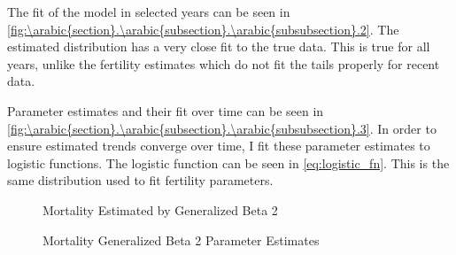 \documentclass[10pt]{article}
\renewcommand{\thesection}{\arabic{section}}
\renewcommand{\thesubsection}{\thesection.\arabic{subsection}}
\renewcommand{\thesubsubsection}{\thesubsection.\arabic{subsubsection}}
\numberwithin{equation}{subsection}
\newcommand*{\FigureDir}{../../graphs}
\begin{document}
\par The fit of the model in selected years can be seen in \autoref{fig:\thesubsubsection.2}. The estimated distribution has a very close fit to the true data. This is true for all years, unlike the fertility estimates which do not fit the tails properly for recent data.

\par Parameter estimates and their fit over time can be seen in \autoref{fig:\thesubsubsection.3}. In order to ensure estimated trends converge over time, I fit these parameter estimates to logistic functions. The logistic function can be seen in \ref{eq:logistic_fn}. This is the same distribution used to fit fertility parameters.

\begin{figure}[!ht]
   \centering
   \caption{\label{fig:\thesubsubsection.2}Mortality Estimated by Generalized Beta 2}
\end{figure}

\begin{figure}[!ht]
   \centering
   \caption{\label{fig:\thesubsubsection.3}Mortality Generalized Beta 2 Parameter Estimates}
\end{figure}
\end{document}
